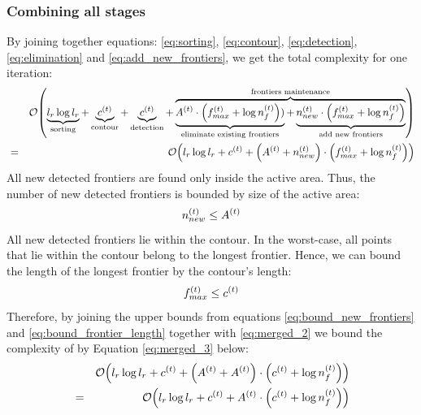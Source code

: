 \subsubsection{Combining all stages}
By joining together equations: \eqref{eq:sorting}, \eqref{eq:contour},
\eqref{eq:detection}, \eqref{eq:elimination} and \eqref{eq:add_new_frontiers},
we get the total complexity for one iteration:
\begin{eqnarray}\label{eq:merged_2}
&&\mathcal{O}{\left( \underbrace{l_r\log{l_r}}_{\textrm{sorting}} + 
        \underbrace{c^{\left(t\right)}}_{\textrm{contour}} +
        \underbrace{c^{\left(t\right)}}_{\textrm{detection}} +
        \overbrace{\underbrace{A^{\left(t\right)} \cdot
                {\left(f_{max}^{\left(t\right)} +
                \log{n_f^{\left(t\right)}}\right)})}_{\textrm{eliminate
                existing frontiers}} + 
                \underbrace{n_{new}^{\left(t\right)} 
                \cdot {\left(f_{max}^{\left(t\right)} + \log{n_f^{\left(t\right)}}
                \right)}}_{\textrm{add new frontiers}}}^{\textrm{frontiers
                maintenance}} \right)}
\nonumber \\
&=&\mathcal{O}{\left( l_r\log{l_r} + 
        c^{\left(t\right)} +
        {\left(A^{\left(t\right)} + n_{new}^{\left(t\right)}\right)}
        \cdot {\left(f_{max}^{\left(t\right)} +
        \log{n_f^{\left(t\right)}}\right)} \right)}
\end{eqnarray}
All new detected frontiers are found only inside the active area. Thus, the
number of new detected frontiers is bounded by size of the active area:
\begin{equation}\label{eq:bound_new_frontiers}
n_{new}^{\left(t\right)} \le A^{\left(t\right)}
\end{equation}
All new detected frontiers lie within the contour. In the worst-case, all
points that lie within the contour belong to the longest frontier. Hence,
we can bound the length of the longest frontier by the contour's length:
\begin{equation}\label{eq:bound_frontier_length}
f_{max}^{\left(t\right)} \le c^{\left(t\right)}
\end{equation}
Therefore, by joining the upper bounds from equations
\eqref{eq:bound_new_frontiers} and
\eqref{eq:bound_frontier_length} together with \eqref{eq:merged_2} we bound the
complexity of \FFD by Equation \eqref{eq:merged_3} below:
\begin{eqnarray}\label{eq:merged_3}
&&\mathcal{O}{\left(l_r\log{l_r} + 
        c^{\left(t\right)} +
        {\left(A^{\left(t\right)} + A^{\left(t\right)}\right)} \cdot
        {\left(c^{\left(t\right)} +
        \log{n_f^{\left(t\right)}}\right)} 
       \right)} \nonumber \\
&=&\mathcal{O}{\left(l_r\log{l_r} + 
        c^{\left(t\right)} +
        A^{\left(t\right)} \cdot
        {\left(c^{\left(t\right)} +
        \log{n_f^{\left(t\right)}}\right)}
        \right)}
\end{eqnarray}
